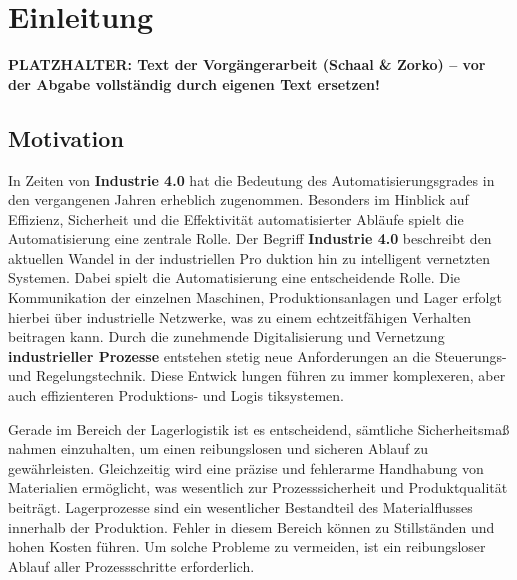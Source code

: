 
\section{Einleitung}

\noindent\colorbox{red!15}{\parbox{\dimexpr\textwidth-2\fboxsep}{\textbf{\color{red}PLATZHALTER: Text der Vorgängerarbeit (Schaal \& Zorko) – vor der Abgabe vollständig durch eigenen Text ersetzen!}}}


\subsection{Motivation}

    

    
In Zeiten von \textbf{Industrie 4.0} hat die Bedeutung des Automatisierungsgrades in den
vergangenen Jahren erheblich zugenommen.
Besonders im Hinblick auf Effizienz, Sicherheit und die Effektivität automatisierter Abläufe spielt die Automatisierung eine zentrale Rolle.
Der Begriff \textbf{Industrie 4.0} beschreibt den aktuellen Wandel in der industriellen Pro
duktion hin zu intelligent vernetzten Systemen. Dabei spielt die Automatisierung eine
entscheidende Rolle. Die Kommunikation der einzelnen Maschinen, Produktionsanlagen
und Lager erfolgt hierbei über industrielle Netzwerke, was zu einem echtzeitfähigen
Verhalten beitragen kann.
Durch die zunehmende Digitalisierung und Vernetzung \textbf{industrieller Prozesse} entstehen
stetig neue Anforderungen an die Steuerungs- und Regelungstechnik. Diese Entwick
lungen führen zu immer komplexeren, aber auch effizienteren Produktions- und Logis
tiksystemen.


Gerade im Bereich der Lagerlogistik ist es entscheidend, sämtliche Sicherheitsmaß
nahmen einzuhalten, um einen reibungslosen und sicheren Ablauf zu gewährleisten.
Gleichzeitig wird eine präzise und fehlerarme Handhabung von Materialien ermöglicht,
was wesentlich zur Prozesssicherheit und Produktqualität beiträgt. Lagerprozesse sind
ein wesentlicher Bestandteil des Materialflusses innerhalb der Produktion. Fehler in
diesem Bereich können zu Stillständen und hohen Kosten führen. Um solche Probleme
zu vermeiden, ist ein reibungsloser Ablauf aller Prozessschritte erforderlich.

